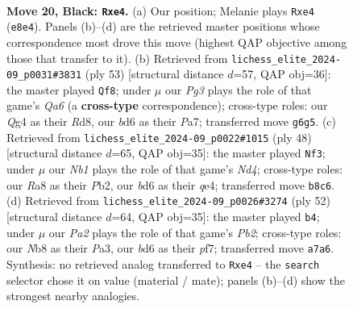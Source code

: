 \documentclass[11pt]{article}
\begin{document}
\clearpage

\begin{figure}[p]\centering
\begin{subfigure}{0.46\textwidth}\centering
\resizebox{\linewidth}{!}{%
\newchessgame
\chessboard[
  setfen={rn2r1k1/p4p1p/3B2p1/8/2Q1P1q1/8/P4P1P/R6K b - - 0 20},
  showmover=false,
  pgfstyle=straightmove, color=movearrow, markmove={e8-e4}
]}
\caption{}
\end{subfigure}\hfill
\begin{subfigure}{0.46\textwidth}\centering
\resizebox{\linewidth}{!}{%
\newchessgame
\chessboard[
  setfen={3r2k1/p2P1pp1/1p5p/3Q4/8/q6P/5PP1/4R1K1 b - - 1 27},
  showmover=false,
  pgfstyle=straightmove, color=movearrow, markmove={a3-f8}
]}
\caption{}
\end{subfigure}
\\[4pt]
\begin{subfigure}{0.46\textwidth}\centering
\resizebox{\linewidth}{!}{%
\newchessgame
\chessboard[
  setfen={r5k1/p4pp1/Qp3b1p/8/3Nq3/8/PP4PP/3R2K1 w - - 0 25},
  showmover=false,
  pgfstyle=straightmove, color=movearrow, markmove={d4-f3}
]}
\caption{}
\end{subfigure}\hfill
\begin{subfigure}{0.46\textwidth}\centering
\resizebox{\linewidth}{!}{%
\newchessgame
\chessboard[
  setfen={1r3k2/3q1p1p/4pp2/p7/6Q1/P5P1/1P3P1P/R5K1 w - - 2 27},
  showmover=false,
  pgfstyle=straightmove, color=movearrow, markmove={b2-b4}
]}
\caption{}
\end{subfigure}
\caption{\textbf{Move 20, Black: \texttt{Rxe4}.} (a) Our position; Melanie plays \texttt{Rxe4} (\texttt{e8e4}). Panels (b)--(d) are the retrieved master positions whose correspondence most drove this move (highest QAP objective among those that transfer to it). (b) Retrieved from \texttt{lichess\_elite\_2024-09\_p0031\#3831} (ply 53) [structural distance $d$=57, QAP obj=36]: the master played \texttt{Qf8}; under $\mu$ our \emph{Pg3} plays the role of that game's \emph{Qa6} (a \textbf{cross-type} correspondence); cross-type roles: our \emph{Q}g4 as their \emph{R}d8, our \emph{b}d6 as their \emph{P}a7; transferred move \texttt{g6g5}. (c) Retrieved from \texttt{lichess\_elite\_2024-09\_p0022\#1015} (ply 48) [structural distance $d$=65, QAP obj=35]: the master played \texttt{Nf3}; under $\mu$ our \emph{Nb1} plays the role of that game's \emph{Nd4}; cross-type roles: our \emph{R}a8 as their \emph{P}b2, our \emph{b}d6 as their \emph{q}e4; transferred move \texttt{b8c6}. (d) Retrieved from \texttt{lichess\_elite\_2024-09\_p0026\#3274} (ply 52) [structural distance $d$=64, QAP obj=35]: the master played \texttt{b4}; under $\mu$ our \emph{Pa2} plays the role of that game's \emph{Pb2}; cross-type roles: our \emph{N}b8 as their \emph{P}a3, our \emph{b}d6 as their \emph{p}f7; transferred move \texttt{a7a6}. Synthesis: no retrieved analog transferred to \texttt{Rxe4} -- the \texttt{search} selector chose it on value (material / mate); panels (b)--(d) show the strongest nearby analogies.}
\label{fig:thought-m39}
\end{figure}
\end{document}
